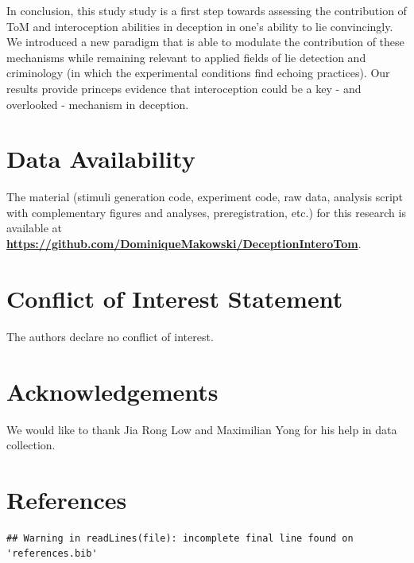 \documentclass[
  man,floatsintext]{apa6}
\begin{document}
In conclusion, this study study is a first step towards assessing the contribution of ToM and interoception abilities in deception in one's ability to lie convincingly. We introduced a new paradigm that is able to modulate the contribution of these mechanisms while remaining relevant to applied fields of lie detection and criminology (in which the experimental conditions find echoing practices). Our results provide princeps evidence that interoception could be a key - and overlooked - mechanism in deception.

\hypertarget{data-availability}{%
\section{Data Availability}\label{data-availability}}

The material (stimuli generation code, experiment code, raw data, analysis script with complementary figures and analyses, preregistration, etc.) for this research is available at \textbf{\url{https://github.com/DominiqueMakowski/DeceptionInteroTom}}.

\hypertarget{conflict-of-interest-statement}{%
\section{Conflict of Interest Statement}\label{conflict-of-interest-statement}}

The authors declare no conflict of interest.

\hypertarget{acknowledgements}{%
\section{Acknowledgements}\label{acknowledgements}}

We would like to thank Jia Rong Low and Maximilian Yong for his help in data collection.

\newpage

\hypertarget{references}{%
\section{References}\label{references}}

\begin{verbatim}
## Warning in readLines(file): incomplete final line found on 'references.bib'
\end{verbatim}

\begingroup
\setlength{\parindent}{-0.5in}
\setlength{\leftskip}{0.5in}
\end{document}
